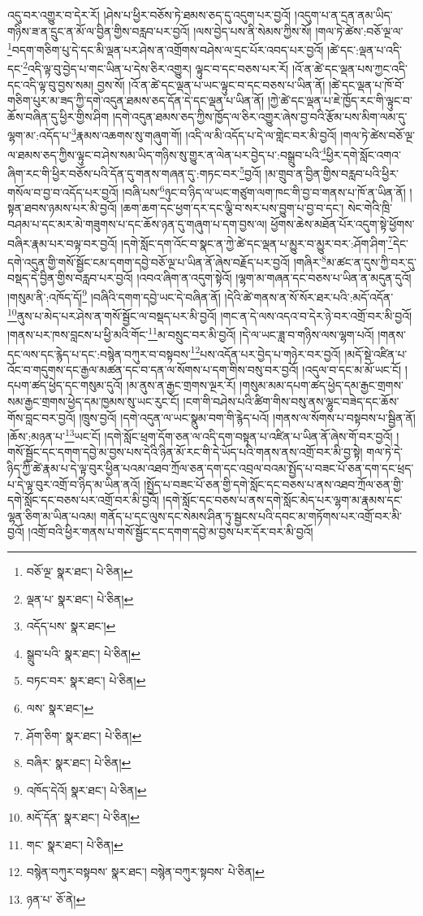 འདུ་བར་འགྱུར་བ་དེར་རོ། །ཤེས་པ་ཕྱིར་བཅོས་ཏེ་ཐམས་ཅད་དུ་འདུག་པར་བྱའོ། །འདུག་པ་ན་དྲན་ནམ་ཡིད་གཉིས་ཟ་ན་དྲུང་ན་མོ་ལ་བྱིན་གྱིས་བརླབ་པར་བྱའོ། །ལས་བྱེད་པས་ནི་སེམས་ཀྱིས་སོ། །གལ་ཏེ་ཚེས་:བཅོ་ལྔ་ལ་\footnote{བཅོ་ལྔ་  སྣར་ཐང་།  པེ་ཅིན། }བདག་གཅིག་པུ་དེ་དང་མི་ལྡན་པར་ཤེས་ན་འགྲོགས་བཤེས་ལ་དྲང་པོར་འབད་པར་བྱའོ། །ཚེ་དང་:ལྡན་པ་འདི་དང་\footnote{ལྡན་པ་  སྣར་ཐང་།  པེ་ཅིན། }འདི་ལྟ་བུ་བྱེད་པ་གང་ཡིན་པ་དེས་ཅིར་འགྱུར། ལྟུང་བ་དང་བཅས་པར་རོ། །འོ་ན་ཚེ་དང་ལྡན་པས་ཀྱང་འདི་དང་འདི་ལྟ་བུ་བྱས་སམ། བྱས་སོ། །འོ་ན་ཚེ་དང་ལྡན་པ་ཡང་ལྟུང་བ་དང་བཅས་པ་ཡིན་ནོ། །ཚེ་དང་ལྡན་པ་ཁོ་བོ་གཅིག་པུར་མ་ཟད་ཀྱི་དགེ་འདུན་ཐམས་ཅད་དོན་དེ་དང་ལྡན་པ་ཡིན་ནོ། །ཀྱེ་ཚེ་དང་ལྡན་པ་ཇེ་ཁྱོད་རང་གི་ལྟུང་བ་ཆོས་བཞིན་དུ་ཕྱིར་གྱིས་ཤིག །དགེ་འདུན་ཐམས་ཅད་ཀྱིས་ཁྱོད་ལ་ཅིར་འགྱུར་ཞེས་བྱ་བའི་རྩོམ་པས་མིག་ལམ་དུ་ལྷག་མ་:འདོད་པ་\footnote{འདོད་པས་  སྣར་ཐང་། }རྣམས་འཆགས་སུ་གཞུག་གོ། །འདི་ལ་མི་འདོད་པ་དེ་ལ་གླེང་བར་མི་བྱའོ། །གལ་ཏེ་ཚེས་བཅོ་ལྔ་ལ་ཐམས་ཅད་ཀྱིས་ལྟུང་བ་ཤེས་སམ་ཡིད་གཉིས་སུ་གྱུར་ན་ལེན་པར་བྱེད་པ་:བསྒྲུབ་པའི་\footnote{སྒྲུབ་པའི་  སྣར་ཐང་།  པེ་ཅིན། }ཕྱིར་དགེ་སློང་འགའ་ཞིག་རང་གི་ཕྱིར་བཅོས་པའི་དོན་དུ་གནས་གཞན་དུ་:གཏང་བར་\footnote{བཏང་བར་  སྣར་ཐང་།  པེ་ཅིན། }བྱའོ། །མ་གྲུབ་ན་བྱིན་གྱིས་བརླབ་པའི་ཕྱིར་གསོལ་བ་བྱ་བ་འདོད་པར་བྱའོ། །བཞི་པས་\footnote{ལས་  སྣར་ཐང་། }ཉུང་བ་ཉིད་ལ་ཡང་གཙུག་ལག་ཁང་གི་བྱ་བ་གནས་པ་ཁོ་ན་ཡིན་ནོ། །སྟན་ཐབས་ཉམས་པར་མི་བྱའོ། །ཆག་ཆག་དང་ཕྱག་དར་དང་ལྕི་བ་སར་པས་བྱུག་པ་བྱ་བ་དང་། སེང་གེའི་ཁྲི་བཤམ་པ་དང་མར་མེ་གཟུགས་པ་དང་ཆོས་ཉན་དུ་གཞུག་པ་དག་བྱས་ལ། ཕྱོགས་ཆེས་མཐོན་པོར་འདུག་སྟེ་ཕྱོགས་བཞིར་རྣམ་པར་བལྟ་བར་བྱའོ། །དགེ་སློང་དག་འོང་བ་སྣང་ན་ཀྱེ་ཚེ་དང་ལྡན་པ་མྱུར་བ་མྱུར་བར་:ཤོག་ཤིག་\footnote{ཤོག་ཅིག་  སྣར་ཐང་།  པེ་ཅིན། }དེང་དགེ་འདུན་གྱི་གསོ་སྦྱོང་ངམ་དགག་དབྱེ་བཅོ་ལྔ་པ་ཡིན་ནོ་ཞེས་བརྗོད་པར་བྱའོ། །གཞིར་\footnote{བཞིར་  སྣར་ཐང་།  པེ་ཅིན། }མ་ཚང་ན་དུས་ཀྱི་བར་དུ་བསྡད་དེ་བྱིན་གྱིས་བརླབ་པར་བྱའོ། །འབའ་ཞིག་ན་འདུག་སྟེའོ། །ལྷག་མ་གཞན་དང་བཅས་པ་ཡིན་ན་མདུན་དུའོ། །གསུམ་ནི་:འཁོད་དོ།\footnote{འཁོད་དེའོ།  སྣར་ཐང་།  པེ་ཅིན། } །བཞིའི་དགག་དབྱེ་ཡང་དེ་བཞིན་ནོ། །དེའི་ཚེ་གནས་ན་སོ་སོར་ཐར་པའི་:མདོ་འདོན་\footnote{མདོ་དོན་  སྣར་ཐང་།  པེ་ཅིན། }ནུས་པ་མེད་པར་ཤེས་ན་གསོ་སྦྱོང་ལ་བསྡད་པར་མི་བྱའོ། །གང་ན་དེ་ལས་འདའ་བ་དེར་ཉེ་བར་འགྲོ་བར་མི་བྱའོ། །གནས་པར་ཁས་བླངས་པ་ཕྱི་མའི་གོང་\footnote{གང་  སྣར་ཐང་།  པེ་ཅིན། }མ་བསྲུང་བར་མི་བྱའོ། །དེ་ལ་ཡང་ཟླ་བ་གཉིས་ལས་ལྷག་པའོ། །གནས་དང་ལས་དང་རྙེད་པ་དང་:བསྙེན་བཀུར་བ་བསྟབས་\footnote{བསྙེན་བཀུར་བསྟབས་  སྣར་ཐང་། བསྙེན་བཀུར་སྟབས་  པེ་ཅིན། }པས་འདོན་པར་བྱེད་པ་གཉེར་བར་བྱའོ། །མདོ་སྡེ་འཛིན་པ་འོང་བ་གདུགས་དང་རྒྱལ་མཚན་དང་བ་དན་ལ་སོགས་པ་དག་གིས་བསུ་བར་བྱའོ། །འདུལ་བ་དང་མ་མོ་ཡང་ངོ། །དཔག་ཚད་ཕྱེད་དང་གསུམ་དུའོ། །མ་ནུས་ན་རྒྱང་གྲགས་ལྔར་རོ། །གསུམ་མམ་དཔག་ཚད་ཕྱེད་དམ་རྒྱང་གྲགས་སམ་རྒྱང་གྲགས་ཕྱེད་དམ་ཁྱམས་སུ་ཡང་རུང་ངོ། །ངག་གི་བཤེས་པའི་ཚིག་གིས་བསུ་ནས་ལྷུང་བཟེད་དང་ཆོས་གོས་བླང་བར་བྱའོ། །ཁྲུས་བྱའོ། །དགེ་འདུན་ལ་ཡང་སྣུམ་བག་གི་རྙེད་པའོ། །གནས་ལ་སོགས་པ་བསྟབས་པ་སྦྱིན་ནོ། །ཆོས་:མཉན་པ་\footnote{ཉན་པ་  ཅོ་ནེ། }ཡང་ངོ། །དགེ་སློང་ཕྲག་དོག་ཅན་ལ་འདི་དག་བསྟན་པ་འཛིན་པ་ཡིན་ནོ་ཞེས་གོ་བར་བྱའོ། །གསོ་སྦྱོང་དང་དགག་དབྱེ་མ་བྱས་པས་དེའི་ཉིན་མོ་རང་གི་དེ་ཡོད་པའི་གནས་ནས་འགྲོ་བར་མི་བྱ་སྟེ། གལ་ཏེ་དེ་ཉིད་ཀྱི་ཚེ་རྣམ་པ་དེ་ལྟ་བུར་ཕྱིན་པའམ་འཐབ་ཀྲོལ་ཅན་དག་དང་འབྲལ་བའམ་སྤྱོད་པ་བཟང་པོ་ཅན་དག་དང་ཕྲད་པ་དེ་ལྟ་བུར་འགྲོ་བ་ཉིད་མ་ཡིན་ནའོ། །སྤྱོད་པ་བཟང་པོ་ཅན་གྱི་དགེ་སློང་དང་བཅས་པ་ནས་འཐབ་ཀྲོལ་ཅན་གྱི་དགེ་སློང་དང་བཅས་པར་འགྲོ་བར་མི་བྱའོ། །དགེ་སློང་དང་བཅས་པ་ནས་དགེ་སློང་མེད་པར་ལྷག་མ་རྣམས་དང་ལྷན་ཅིག་མ་ཡིན་པའམ། གནོད་པ་དང་ལུས་དང་སེམས་ཤིན་ཏུ་སྦྱངས་པའི་དབང་མ་གཏོགས་པར་འགྲོ་བར་མི་བྱའོ། །འགྲོ་བའི་ཕྱིར་གནས་པ་གསོ་སྦྱོང་དང་དགག་དབྱེ་མ་བྱས་པར་དོར་བར་མི་བྱའོ། 